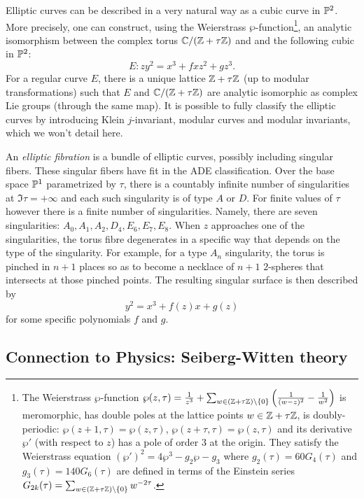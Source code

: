     Elliptic curves can be described in a very natural way as a cubic curve in $\P^2$. More precisely, one can construct, using the Weierstrass $\wp$-function\footnote{The Weierstrass $\wp$-function $\wp(z,\tau)=\frac{1}{z^3}+\sum_{w\in (\Z+\tau\Z)\backslash\{0\}}\left( \frac{1}{(w-z)^2}-\frac{1}{w^2} \right)$ is meromorphic, has double poles at the lattice points $w\in\Z+\tau\Z$, is doubly-periodic: $\wp(z+1,\tau)=\wp(z,\tau)$, $\wp(z+\tau,\tau)=\wp(z,\tau)$ and its derivative $\wp'$ (with respect to $z$) has a pole of order $3$ at the origin. They satisfy the Weierstrass equation $(\wp')^2=4\wp^3-g_2\wp-g_3$ where $g_2(\tau)=60G_4(\tau)$ and $g_3(\tau)=140G_6(\tau)$ are defined in terms of the Einstein series $G_{2k}(\tau)=\sum_{w\in (\Z+\tau\Z)\backslash\{0\}}w^{-2\tau}$.}, an analytic isomorphism between the complex torus $\C/(\Z+\tau\Z)$ and and the following cubic in $\P^2$:
    \begin{equation}
        E:zy^2=x^3+fxz^2+gz^3.
    \end{equation}
    For a regular curve $E$, there is a unique lattice $\Z+\tau\Z$ (up to modular transformations) such that $E$ and $\C/(\Z+\tau\Z)$ are analytic isomorphic as complex Lie groups (through the same map). It is possible to fully classify the elliptic curves by introducing Klein $j$-invariant, modular curves and modular invariants, which we won't detail here.

    An \emph{elliptic fibration} is a bundle of elliptic curves, possibly including singular fibers. These singular fibers have fit in the ADE classification. Over the base space $\P^1$ parametrized by $\tau$, there is a countably infinite number of singularities at $\Im\tau=+\infty$ and each such singularity is of type $A$ or $D$. For finite values of $\tau$ however there is a finite number of singularities. Namely, there are seven singularities: $A_0,A_1,A_2,D_4,E_6,E_7,E_8$. When $z$ approaches one of the singularities, the torus fibre degenerates in a specific way that depends on the type of the singularity. For example, for a type $A_n$ singularity, the torus is pinched in $n+1$ places so as to become a necklace of $n+1$ $2$-spheres that intersects at those pinched points. The resulting singular surface is then described by
    \begin{equation}
        y^2=x^3+f(z)x+g(z)
    \end{equation}
    for some specific polynomials $f$ and $g$.

    \subsection{Connection to Physics: Seiberg-Witten theory}

